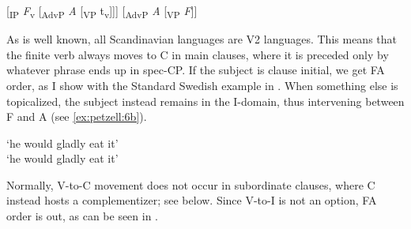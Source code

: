 \documentclass[output=paper,colorlinks,citecolor=brown,draft,draftmode]{langscibook}
\begin{document}
\ea\label{ex:petzell:5}
\ea\label{ex:petzell:5a}
[\textsubscript{IP} \textit{F}\textsubscript{v} [\textsubscript{AdvP} \textit{A} [\textsubscript{VP} t\textsubscript{v}]]]                      
\ex\label{ex:petzell:5b}{}  [\textsubscript{AdvP} \textit{A} [\textsubscript{VP} \textit{F}]]                        
\z
\z


As is well known, all Scandinavian languages are V2 languages. This means that the finite verb always moves to C in main clauses, where it is preceded only by whatever phrase ends up in spec-CP. If the subject is clause initial, we get FA order, as I show with the Standard Swedish example in . When something else is topicalized, the subject instead remains in the I-domain, thus intervening between F and A (see \ref{ex:petzell:6b}).


\ea\label{ex:petzell:6}
\glt `he would gladly eat it’  \\
\glt `he would gladly eat it’
\z
\z


Normally, V-to-C movement does not occur in subordinate clauses, where C instead hosts a complementizer; see  below. Since V-to-I is not an option, FA order is out, as can be seen in .\largerpage


\ea\label{ex:petzell:7}
\end{document}
